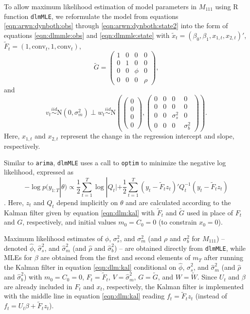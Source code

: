 To allow maximum likelihood estimation of model parameters in $M_{111}$ using R function {\tt dlmMLE}, we reformulate the model from equations \eqref{eqn:arwn:dynboth:obs} through \eqref{eqn:arwn:dynboth:state2} into the form of equations \eqref{eqn:dlmmle:obs} and \eqref{eqn:dlmmle:state} with $\tilde{x}_t = (\beta_0,\beta_1,x_{1,t},x_{2,t})'$, $\tilde{F}_t = (1,\mbox{conv}_t,1,\mbox{conv}_t)$,
\[\tilde{G} = \left(\begin{array}{cccc} 1 & 0 & 0 & 0 \\ 0 & 1 & 0 & 0 \\ 0 & 0 & \phi & 0 \\ 0 & 0 & 0 & \rho \end{array}\right), \]
and \[v_t \stackrel{iid}{\sim} \mbox{N}(0,\sigma^2_m) \perp w_t \stackrel{iid}{\sim} \mbox{N}\left(\left(\begin{array}{c} 0 \\ 0 \\ 0 \\ 0 \end{array}\right), \left(\begin{array}{cccc} 0 & 0 & 0 & 0 \\ 0 & 0 & 0 & 0 \\ 0 & 0 & \sigma^2_s & 0 \\  0 & 0 & 0 & \sigma^2_b \end{array}\right)\right).\]
Here, $x_{1,t}$ and $x_{2,t}$ represent the change in the regression intercept and slope, respectively.

Similar to {\tt arima}, {\tt dlmMLE} uses a call to {\tt optim} to minimize the negative log likelihood, expressed as
\begin{equation}
-\log p(y_{1:T}|\theta) \propto \frac{1}{2}\sum_{t=1}^T \log |Q_t| + \frac{1}{2}\sum_{t=1}^T (y_t-\tilde{F}_tz_t)'Q_t^{-1}(y_t-\tilde{F}_tz_t) \label{eqn:fmri:dlmll}
\end{equation}
\citep[Chapter 4]{petris:camp:2009:dynamic}. Here, $z_t$ and $Q_t$ depend implicitly on $\theta$ and are calculated according to the Kalman filter given by equation \eqref{eqn:dlm:kal} with $\tilde{F}_t$ and $\tilde{G}$ used in place of $F_t$ and $G$, respectively, and initial values $m_0 = C_0 = 0$ (to constrain $x_0 = 0$).

Maximum likelihood estimates of $\phi$, $\sigma^2_s$, and $\sigma^2_m$ (and $\rho$ and $\sigma^2_b$ for $M_{111}$) -- denoted $\hat{\phi}$, $\hat{\sigma}^2_s$, and $\hat{\sigma}^2_m$ (and $\hat{\rho}$ and $\hat{\sigma}^2_b$) -- are obtained directly from {\tt dlmMLE}, while MLEs for $\beta$ are obtained from the first and second elements of $m_T$ after running the Kalman filter in equation \eqref{eqn:dlm:kal} conditional on $\hat{\phi}$, $\hat{\sigma}^2_s$, and $\hat{\sigma}^2_m$ (and $\hat{\rho}$ and $\hat{\sigma}^2_b$) with $m_0 = C_0 = 0$, $F_t = \tilde{F}_t$, $V = \hat{\sigma}^2_m$, $G = \tilde{G}$, and $W = \tilde{W}$. Since $U_t$ and $\beta$ are already included in $F_t$ and $x_t$, respectively, the Kalman filter is implemented with the middle line in equation \eqref{eqn:dlm:kal} reading $f_t = \tilde{F}_tz_t$ (instead of $f_t = U_t\beta + \tilde{F}_tz_t$).

